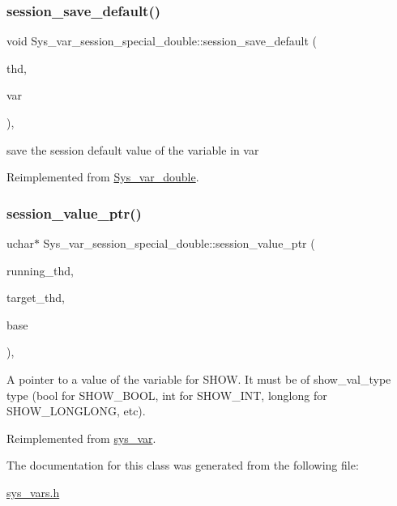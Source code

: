 \subsubsection{\texorpdfstring{session\+\_\+save\+\_\+default()}{session\_save\_default()}}
{\footnotesize\ttfamily void Sys\+\_\+var\+\_\+session\+\_\+special\+\_\+double\+::session\+\_\+save\+\_\+default (\begin{DoxyParamCaption}\item[{T\+HD $\ast$}]{thd,  }\item[{\mbox{\hyperlink{classset__var}{set\+\_\+var}} $\ast$}]{var }\end{DoxyParamCaption})\hspace{0.3cm}{\ttfamily [inline]}, {\ttfamily [virtual]}}

save the session default value of the variable in var 

Reimplemented from \mbox{\hyperlink{classSys__var__double_a11ba42d3f6f65a0bf3dcaf4e2d8d1d22}{Sys\+\_\+var\+\_\+double}}.

\mbox{\label{classSys__var__session__special__double_a0469d552abad9ba290266fe16a87528e}} 
\subsubsection{\texorpdfstring{session\+\_\+value\+\_\+ptr()}{session\_value\_ptr()}}
{\footnotesize\ttfamily uchar$\ast$ Sys\+\_\+var\+\_\+session\+\_\+special\+\_\+double\+::session\+\_\+value\+\_\+ptr (\begin{DoxyParamCaption}\item[{T\+HD $\ast$}]{running\+\_\+thd,  }\item[{T\+HD $\ast$}]{target\+\_\+thd,  }\item[{L\+E\+X\+\_\+\+S\+T\+R\+I\+NG $\ast$}]{base }\end{DoxyParamCaption})\hspace{0.3cm}{\ttfamily [inline]}, {\ttfamily [virtual]}}

A pointer to a value of the variable for S\+H\+OW. It must be of show\+\_\+val\+\_\+type type (bool for S\+H\+O\+W\+\_\+\+B\+O\+OL, int for S\+H\+O\+W\+\_\+\+I\+NT, longlong for S\+H\+O\+W\+\_\+\+L\+O\+N\+G\+L\+O\+NG, etc). 

Reimplemented from \mbox{\hyperlink{classsys__var_a3e511591aaf555d2bc2ce40a80b7e899}{sys\+\_\+var}}.



The documentation for this class was generated from the following file\+:\begin{DoxyCompactItemize}
\item 
\mbox{\hyperlink{sys__vars_8h}{sys\+\_\+vars.\+h}}\end{DoxyCompactItemize}
